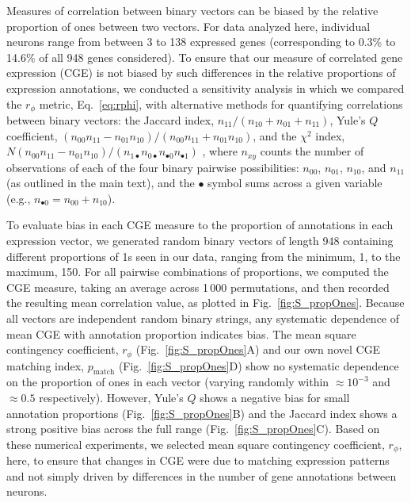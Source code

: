 \documentclass[10pt,letterpaper]{article}
\begin{document}
{Measures of correlation between binary vectors can be biased by the relative proportion of ones between two vectors.
For data analyzed here, individual neurons range from between 3 to 138 expressed genes (corresponding to 0.3\% to 14.6\% of all 948 genes considered).
To ensure that our measure of correlated gene expression (CGE) is not biased by such differences in the relative proportions of expression annotations, we conducted a sensitivity analysis in which we compared the $r_\phi$ metric, Eq.~\eqref{eq:rphi}, with alternative methods for quantifying correlations between binary vectors: the
Jaccard index, $n_{11}/(n_{10} + n_{01} + n_{11})$,
Yule's $Q$ coefficient, $(n_{00}n_{11} - n_{01}n_{10})/(n_{00}n_{11} + n_{01}n_{10})$,
and the $\chi^2$ index, $N (n_{00}n_{11} - n_{01}n_{10})/(n_{1\bullet}n_{0\bullet}n_{\bullet 0}n_{\bullet 1})$ \cite{Kaufman2006}, where $n_{xy}$ counts the number of observations of each of the four binary pairwise possibilities: $n_{00}$, $n_{01}$, $n_{10}$, and $n_{11}$ (as outlined in the main text), and the $\bullet$ symbol sums across a given variable (e.g., $n_{\bullet 0} = n_{00} + n_{10}$).

To evaluate bias in each CGE measure to the proportion of annotations in each expression vector, we generated random binary vectors of length 948 containing different proportions of 1s seen in our data, ranging from the minimum, 1, to the maximum, 150.
For all pairwise combinations of proportions, we computed the CGE measure, taking an average across 1\,000 permutations, and then recorded the resulting mean correlation value, as plotted in Fig.~\ref{fig:S_propOnes}.
Because all vectors are independent random binary strings, any systematic dependence of mean CGE with annotation proportion indicates bias.
The mean square contingency coefficient, $r_\phi$ (Fig.~\ref{fig:S_propOnes}A) and our own novel CGE matching index, $p_\mathrm{match}$ (Fig.~\ref{fig:S_propOnes}D) show no systematic dependence on the proportion of ones in each vector (varying randomly within $\approx 10^{-3}$ and $\approx 0.5$ respectively).
However, Yule's $Q$ shows a negative bias for small annotation proportions (Fig.~\ref{fig:S_propOnes}B) and the Jaccard index shows a strong positive bias across the full range (Fig.~\ref{fig:S_propOnes}C).
Based on these numerical experiments, we selected mean square contingency coefficient, $r_\phi$, here, to ensure that changes in CGE were due to matching expression patterns and not simply driven by differences in the number of gene annotations between neurons.

}
\end{document}
